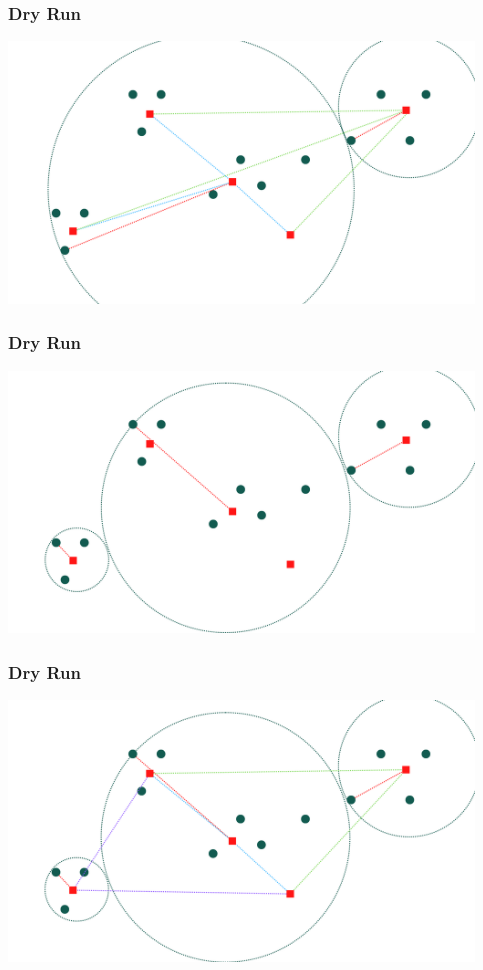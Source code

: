 \documentclass{beamer}
\begin{document}
\begin{frame}[c]
    \frametitle{Dry Run}
    \centering \includegraphics[width=350pt]{./9.png}
\end{frame}
   
\begin{frame}[c]
    \frametitle{Dry Run}
    \centering \includegraphics[width=350pt]{./10.png}
\end{frame}
   
\begin{frame}[c]
    \frametitle{Dry Run}
    \centering \includegraphics[width=350pt]{./11.png}
\end{frame}
\end{document}
